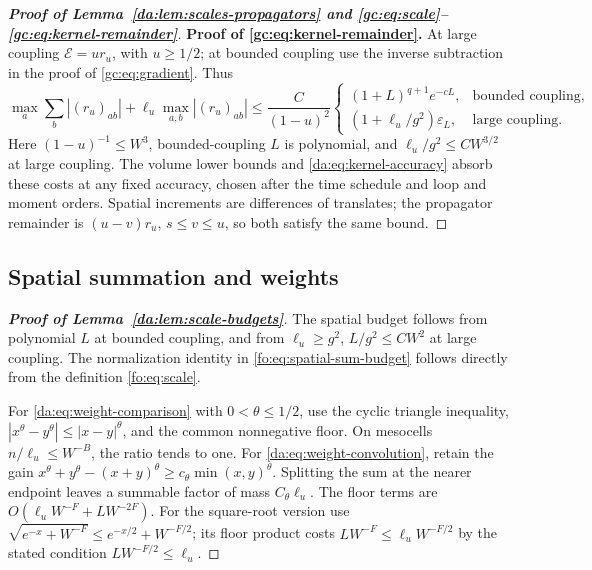 \documentclass[11pt]{article}
\numberwithin{equation}{section}
\theoremstyle{remark}
\begin{document}
\begin{proof}[\textbf{Proof of Lemma~\ref{da:lem:scales-propagators} and
\eqref{gc:eq:scale}--\eqref{gc:eq:kernel-remainder}}]
\noindent\textbf{Proof of \eqref{gc:eq:kernel-remainder}.}
At large coupling $\mathcal E=ur_u$, with $u\ge1/2$;
at bounded coupling use the inverse subtraction in the proof of
\eqref{gc:eq:gradient}. Thus
\[
 \max_a\sum_b|(r_u)_{ab}|+\ell_u\max_{a,b}|(r_u)_{ab}|
 \le\frac{C}{(1-u)^2}
 \begin{cases}
 (1+L)^{q+1}e^{-cL},&\text{bounded coupling},\\
 (1+\ell_u/g^2)\varepsilon_L,&\text{large coupling}.
 \end{cases}
\]
Here $(1-u)^{-1}\le W^3$, bounded-coupling $L$ is polynomial,
and $\ell_u/g^2\le CW^{3/2}$ at large coupling.
The volume lower bounds and \eqref{da:eq:kernel-accuracy} absorb these
costs at any fixed accuracy, chosen after the time schedule and loop
and moment orders. Spatial increments are differences of translates;
the propagator remainder is $(u-v)r_u$, $s\le v\le u$, so both
satisfy the same bound.
\end{proof}


\subsection{Spatial summation and weights}\label{app:scale-budgets}
\begin{proof}[\textbf{Proof of Lemma~\ref{da:lem:scale-budgets}}]
The spatial budget follows from polynomial $L$ at bounded coupling,
and from $\ell_u\ge g^2$, $L/g^2\le CW^2$ at large coupling.
The normalization identity in \eqref{fo:eq:spatial-sum-budget} follows
directly from the definition \eqref{fo:eq:scale}.

For \eqref{da:eq:weight-comparison} with $0<\theta\le1/2$, use the
cyclic triangle inequality,
$|x^\theta-y^\theta|\le|x-y|^\theta$, and the common nonnegative floor.
On mesocells
$n/\ell_u\le W^{-B}$, the ratio tends to one.
For \eqref{da:eq:weight-convolution}, retain the gain
$x^\theta+y^\theta-(x+y)^\theta\ge c_\theta\min(x,y)^\theta$.
Splitting the sum at the nearer endpoint leaves a summable factor of
mass $C_\theta\ell_u$. The floor terms are
$O(\ell_uW^{-F}+LW^{-2F})$.
For the square-root version use
$\sqrt{e^{-x}+W^{-F}}\le e^{-x/2}+W^{-F/2}$;
its floor product costs $LW^{-F}\le\ell_uW^{-F/2}$ by the stated
condition $LW^{-F/2}\le\ell_u$.

\end{proof}
\end{document}
